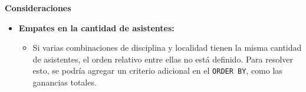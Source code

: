 \textbf{Consideraciones}

\begin{itemize}
   \item \textbf{Empates en la cantidad de asistentes:}
   \begin{itemize}
       \item Si varias combinaciones de disciplina y localidad tienen la misma cantidad de asistentes, el orden relativo entre ellas no está definido. Para resolver esto, se podría agregar un criterio adicional en el \texttt{ORDER BY}, como las ganancias totales.
   \end{itemize}
\end{itemize}
